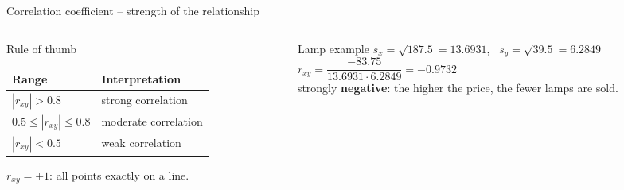 \documentclass[aspectratio=169,11pt]{beamer}
\newcommand{\minlineskip}{%
  \setlength{\lineskiplimit}{2pt}\setlength{\lineskip}{2pt}%
  \setlength{\normallineskiplimit}{2pt}\setlength{\normallineskip}{2pt}}
\begin{document}
\begin{frame}{Correlation coefficient -- strength of the relationship}
  \begin{columns}[T]
    \begin{column}{0.44\textwidth}
      \begin{block}{Rule of thumb}
        \begin{center}
          \small\renewcommand{\arraystretch}{1.1}
          \begin{tabular}{ll}
            \toprule
            \textbf{Range} & \textbf{Interpretation} \\
            \midrule
            $|r_{xy}| > 0.8$           & strong correlation \\
            $0.5 \le |r_{xy}| \le 0.8$ & moderate correlation \\
            $|r_{xy}| < 0.5$           & weak correlation \\
            \bottomrule
          \end{tabular}
        \end{center}
        {\footnotesize $r_{xy} = \pm 1$: all points exactly on a line.\par}
      \end{block}
    \end{column}
    \begin{column}{0.54\textwidth}
      \small\minlineskip
      \begin{exampleblock}{Lamp example}
        $s_x = \sqrt{187.5} = 13.6931$, \ $s_y = \sqrt{39.5} = 6.2849$\\[3pt]
        $r_{xy} = \dfrac{-83.75}{13.6931 \cdot 6.2849} = \mathbf{-0.9732}$\\[3pt]
        strongly \textbf{negative}: the higher the price, the fewer lamps are
        sold.
      \end{exampleblock}
    \end{column}
  \end{columns}
\end{frame}
\end{document}
